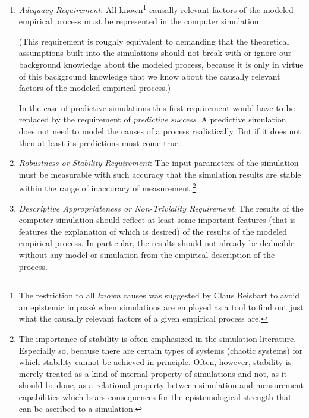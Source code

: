 \begin{enumerate}

\item {\em Adequacy Requirement}: All known\footnote{The restriction to all
    {\em known} causes was suggested by Claus Beisbart to avoid an epistemic
    impassé when simulations are employed as a tool to find out just what the
    causally relevant factors of a given empirical process are.} causally
  relevant factors of the modeled empirical process must be represented in the
  computer simulation.

  (This requirement is roughly equivalent to demanding that the theoretical
  assumptions built into the simulations should not break with or ignore our
  background knowledge about the modeled process, because it is only in virtue
  of this background knowledge that we know about the causally relevant
  factors of the modeled empirical process.)

  In the case of predictive simulations this first requirement would have to
  be replaced by the requirement of {\em predictive success}. A predictive
  simulation does not need to model the causes of a process realistically.
  But if it does not then at least its predictions must come true.

\item {\em Robustness or Stability Requirement}: The input parameters
  of the simulation must be measurable with such accuracy that the
  simulation results are stable within the range of inaccuracy of
  measurement.\footnote{The importance of stability is often emphasized in
the simulation literature. Especially so, because there are certain types of
systems (chaotic systems) for which stability cannot be achieved in principle.
Often, however, stability is merely treated as a kind of internal property of
simulations \cite[p. 23]{troitzsch:2005} and not, as it should be done, as a
relational property between simulation and measurement capabilities which bears
consequences for the epistemological strength that can be ascribed to a
simulation.}

\item {\em Descriptive Appropriateness or Non-Triviality Requirement}:
  The results of the computer simulation should reflect at least some
  important features (that is features the explanation of which is
  desired) of the results of the modeled empirical process. In particular,
  the results should not already be deducible without any model or simulation 
  from the empirical description of the process.

\end{enumerate}

